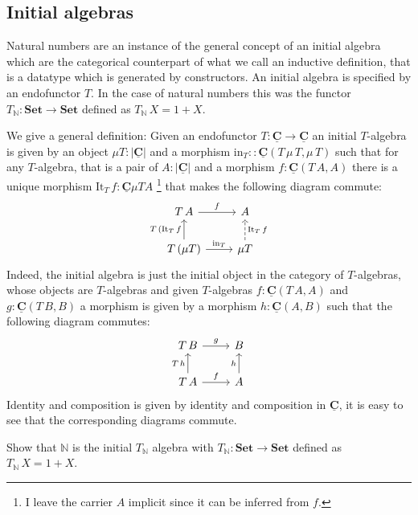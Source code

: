 \documentclass{article}
\newcommand{\Set}{\mathbf{Set}}
\newcommand{\cat}[1]{\underline{\mathbf{#1}}}
\newcommand{\obj}[1]{|#1|}
\newcommand{\homC}[3]{\cat{#1}(#2,#3)}
\newcommand{\Nat}{\mathbb{N}}
\newcommand{\It}{\mathrm{It}}
\newcommand{\inn}{\mathrm{in}}
\begin{document}
\subsection{Initial algebras}
\label{sec:initial-algebras}

Natural numbers are an instance of the general concept of an initial algebra which are the categorical counterpart of what we call an inductive definition, that is a datatype which is generated by constructors. An initial algebra is specified by an endofunctor $T$. In the case of natural numbers this was the functor $T_\Nat : \Set \to \Set$ defined as $T_\Nat\,X = 1+X$. 

We give a general definition: Given an endofunctor $T : \cat{C} \to \cat{C}$ an initial $T$-algebra is given by an object $\mu T : \obj{\cat{C}}$ and a morphism $\inn_T : : \homC{C}{T\,\mu\,T}{\mu\,T}$ such that for any $T$-algebra, that is a pair of $A : \obj{\cat{C}}$ and a morphism 
$f : \homC{C}{T\,A}{A}$ there is a unique morphism $\It_T \,f: \cat{C}{\mu T}{A}$
\footnote{I leave the carrier $A$ implicit since it can be inferred from $f$.}
that makes the following diagram commute:
\[\begin{tikzcd}
T\,A \arrow[r,"f"]  & A \\
T\,(\mu T) \arrow[u, "T\, (\It_T \, f"]  \arrow[r,"\inn_T"] & \mu T \arrow[u,"\It_T \, f" right,dashrightarrow]
\end{tikzcd}\]  
Indeed, the initial algebra is just the initial object in the category of $T$-algebras, whose objects are $T$-algebras and given $T$-algebras $f : \homC{C}{T\,A}{A}$ and $g : \homC{C}{T\,B}{B}$ a morphism is given by a morphism $h : \homC{C}{A}{B}$ such that the following diagram commutes:
\[\begin{tikzcd}
T\,B \arrow[r,"g"] & B \\
 T\,A \arrow[r,"f"] \arrow[u,"T\,h"]  & A \arrow[u,"h"] 
\end{tikzcd}\]  
Identity and composition is given by identity and composition in $\cat{C}$, it is easy to see that the corresponding diagrams commute. 

\begin{Exercise}
Show that $\Nat$ is the initial $T_\Nat$ algebra with $T_\Nat : \Set \to \Set$ defined as $T_\Nat\,X = 1+X$. 
\end{Exercise}
\end{document}
